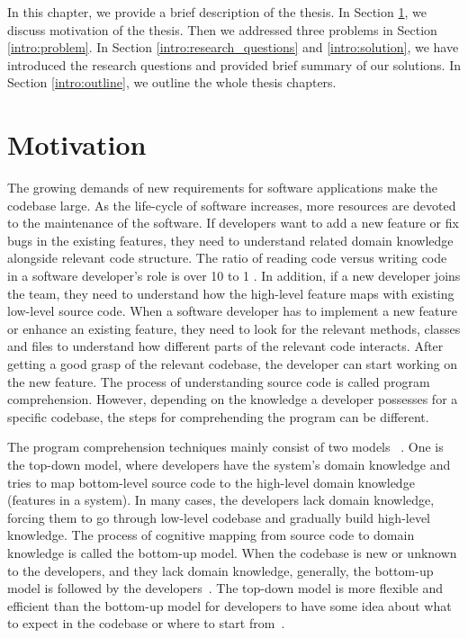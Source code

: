 In this chapter, we provide a brief description of the thesis. In Section \ref{intro:motivation}, we discuss motivation of the thesis. Then we addressed three problems in Section \ref{intro:problem}. In Section \ref{intro:research_questions} and \ref{intro:solution}, we have introduced the research questions and provided brief summary of our solutions. In Section \ref{intro:outline}, we outline the whole thesis chapters. 


\section{Motivation}
\label{intro:motivation}
  The growing demands of new requirements for software applications make the codebase large. As the life-cycle of software increases, more resources are devoted to the maintenance of the software. If developers want to add a new feature or fix bugs in the existing features, they need to understand related domain knowledge alongside relevant code structure. The ratio of reading code versus writing code in a software developer's role is over 10 to 1 \cite{martin2008clean}. In addition, if a new developer joins the team, they need to understand how the high-level feature maps with existing low-level source code. When a software developer has to implement a new feature or enhance an existing feature, they need to look for the relevant methods, classes and files to understand how different parts of the relevant code interacts. After getting a good grasp of the relevant codebase, the developer can start working on the new feature. The process of understanding source code is called program comprehension. However, depending on the knowledge a developer possesses for a specific codebase, the steps for comprehending the program can be different.
 
 
The program comprehension techniques mainly consist of two models ~\cite{tilley1998reverseEngineeringFramework, von1993programToolRequirements, siegmund2016programPastFuture}. One is the top-down model, where developers have the system's domain knowledge and tries to map bottom-level source code to the high-level domain knowledge (features in a system). In many cases, the developers lack domain knowledge, forcing them to go through low-level codebase and gradually build high-level knowledge. The process of cognitive mapping from source code to domain knowledge is called the bottom-up model. When the codebase is new or unknown to the developers, and they lack domain knowledge, generally, the bottom-up model is followed by the developers~\cite{wei2002surveyCategorizationComprehension, siegmund2016programPastFuture}. The top-down model is more flexible and efficient than the bottom-up model for developers to have some idea about what to expect in the codebase or where to start from~\cite{brooks1983theoryComprehensionPrograms}. 
 
